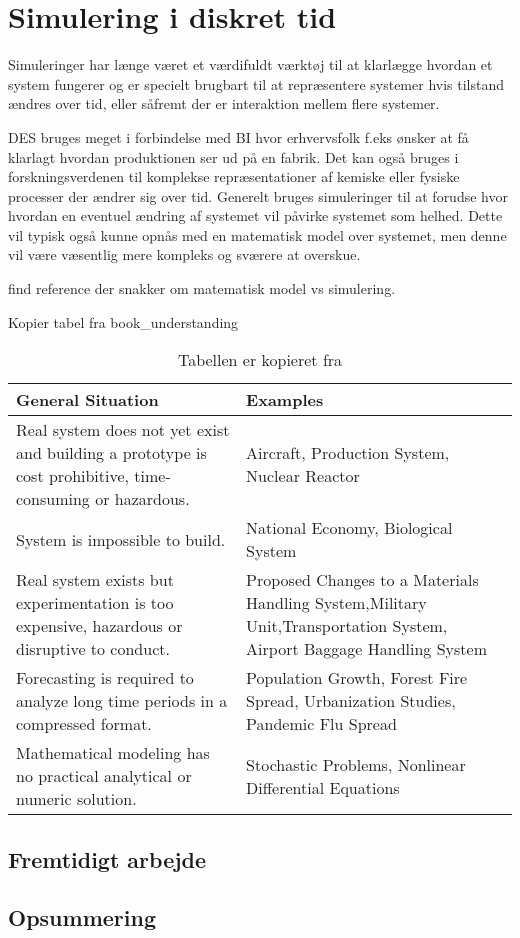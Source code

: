 \chapter{Simulering i diskret tid}
Simuleringer har længe været et værdifuldt værktøj til at klarlægge hvordan et 
system fungerer og er specielt brugbart til at repræsentere systemer hvis 
tilstand ændres over tid, eller såfremt der er interaktion mellem flere systemer.

DES bruges meget i forbindelse med BI hvor erhvervsfolk f.eks ønsker at få klarlagt hvordan produktionen ser ud på en fabrik. Det kan også bruges i forskningsverdenen til komplekse repræsentationer af kemiske eller fysiske processer der ændrer sig over tid. 
Generelt bruges simuleringer til at forudse hvor hvordan en eventuel ændring af systemet vil påvirke systemet som helhed. Dette vil typisk også kunne opnås med en matematisk model over systemet, men denne vil være væsentlig mere kompleks og sværere at overskue. 

find reference der snakker om matematisk model vs simulering. 

Kopier tabel fra book\_understanding


\begin{table}[ht]
	\begin{tabular}{|p{}|p{}|}
	\hline
	General Situation & Examples \\
	\hline
  Real system does not yet exist and building a prototype is cost prohibitive, time-consuming or hazardous. & Aircraft, Production System, Nuclear Reactor \\
  \hline  
  System is impossible to build. & National Economy, Biological System \\
  \hline
  Real system exists but experimentation is too expensive, hazardous or disruptive to conduct. & Proposed Changes to a Materials Handling System,Military Unit,Transportation System, Airport Baggage Handling System \\
  \hline
  Forecasting is required to analyze long time periods in a compressed format. & Population Growth, Forest Fire Spread, Urbanization Studies, Pandemic Flu Spread\\
  \hline
  Mathematical modeling has no practical analytical or numeric solution. & Stochastic Problems, Nonlinear Differential Equations \\
  \hline	
  \end{tabular}
	\caption{Tabellen er kopieret fra \cite{Mchaney2009}}
	\label{tab:simulering}
\end{table}





 

\section{Fremtidigt arbejde}
\section{Opsummering}
